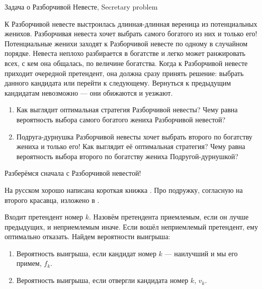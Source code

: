\documentclass[nobib]{tufte-handout}
\theoremstyle{definition}
\newcounter{problem}
\newenvironment{problem}%
{%
\refstepcounter{problem}%
     \hypertarget{problem:{\theproblem}}{}
     \Writetofile{solution_file}{\protect\hypertarget{soln:\theproblem}{}}
     \begin{myenum}[label=\bfseries\protect\hyperlink{soln:\theproblem}{\theproblem},ref=\theproblem]
     \item%
    }%
    {%
    \end{myenum}}
\begin{document}
\begin{problem}
Задача о Разборчивой Невесте, Secretary problem

К Разборчивой невесте выстроилась длинная-длинная вереница из потенциальных женихов.
Разборчивая невеста хочет выбрать самого богатого из них и только его!
Потенциальные женихи заходят к Разборчивой невесте по одному в случайном порядке.
Невеста неплохо разбирается в богатстве
и легко может ранжировать всех, с кем она общалась,
по величине богатства. Когда к Разборчивой невесте приходит очередной претендент,
она должна сразу принять решение: выбрать данного кандидата или перейти к следующему.
Вернуться к предыдущим кандидатам невозможно — они обижаются и уезжают.

\begin{enumerate}
\item Как выглядит оптимальная стратегия Разборчивой невесты?
Чему равна вероятность выбора самого богатого жениха Разборчивой невестой?
\item Подруга-дурнушка Разборчивой невесты хочет
выбрать второго по богатству жениха и только его!
Как выглядит её оптимальная стратегия? Чему равна вероятность выбора
второго по богатству жениха Подругой-дурнушкой?
\end{enumerate}

\begin{sol}

Разберёмся сначала с Разборчивой невестой!

На русском хорошо написана короткая книжка \cite{zade2003nevesta}.
Про подружку, согласную на второго красавца, изложено в \cite{vanderbei2011postdoc}.

Входит претендент номер $k$. Назовём претендента приемлемым, если он лучше предыдущих,
и неприемлемым иначе. Если вошёл неприемлемый претендент, ему оптимально отказать.
Найдем вероятности выигрыша:

\begin{enumerate}
  \item Вероятность выигрыша,
  если кандидат номер $k$ — наилучший и мы его примем, $f_k$.
  \item Вероятность выигрыша, если отвергли кандидата номер $k$, $v_k$.
\end{enumerate}


\end{sol}
\end{problem}
\end{document}
